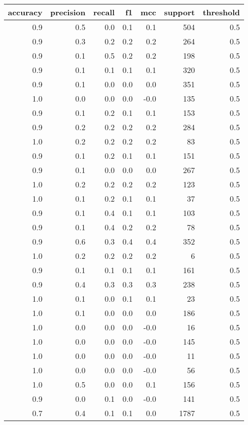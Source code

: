 \begin{tabular}{rrrrrrr}
\toprule
accuracy & precision & recall & f1 & mcc & support & threshold \\
\midrule
0.9 & 0.5 & 0.0 & 0.1 & 0.1 & 504 & 0.5 \\
0.9 & 0.3 & 0.2 & 0.2 & 0.2 & 264 & 0.5 \\
0.9 & 0.1 & 0.5 & 0.2 & 0.2 & 198 & 0.5 \\
0.9 & 0.1 & 0.1 & 0.1 & 0.1 & 320 & 0.5 \\
0.9 & 0.1 & 0.0 & 0.0 & 0.0 & 351 & 0.5 \\
1.0 & 0.0 & 0.0 & 0.0 & -0.0 & 135 & 0.5 \\
0.9 & 0.1 & 0.2 & 0.1 & 0.1 & 153 & 0.5 \\
0.9 & 0.2 & 0.2 & 0.2 & 0.2 & 284 & 0.5 \\
1.0 & 0.2 & 0.2 & 0.2 & 0.2 & 83 & 0.5 \\
0.9 & 0.1 & 0.2 & 0.1 & 0.1 & 151 & 0.5 \\
0.9 & 0.1 & 0.0 & 0.0 & 0.0 & 267 & 0.5 \\
1.0 & 0.2 & 0.2 & 0.2 & 0.2 & 123 & 0.5 \\
1.0 & 0.1 & 0.2 & 0.1 & 0.1 & 37 & 0.5 \\
0.9 & 0.1 & 0.4 & 0.1 & 0.1 & 103 & 0.5 \\
0.9 & 0.1 & 0.4 & 0.2 & 0.2 & 78 & 0.5 \\
0.9 & 0.6 & 0.3 & 0.4 & 0.4 & 352 & 0.5 \\
1.0 & 0.2 & 0.2 & 0.2 & 0.2 & 6 & 0.5 \\
0.9 & 0.1 & 0.1 & 0.1 & 0.1 & 161 & 0.5 \\
0.9 & 0.4 & 0.3 & 0.3 & 0.3 & 238 & 0.5 \\
1.0 & 0.1 & 0.0 & 0.1 & 0.1 & 23 & 0.5 \\
1.0 & 0.1 & 0.0 & 0.0 & 0.0 & 186 & 0.5 \\
1.0 & 0.0 & 0.0 & 0.0 & -0.0 & 16 & 0.5 \\
1.0 & 0.0 & 0.0 & 0.0 & -0.0 & 145 & 0.5 \\
1.0 & 0.0 & 0.0 & 0.0 & -0.0 & 11 & 0.5 \\
1.0 & 0.0 & 0.0 & 0.0 & -0.0 & 56 & 0.5 \\
1.0 & 0.5 & 0.0 & 0.0 & 0.1 & 156 & 0.5 \\
0.9 & 0.0 & 0.1 & 0.0 & -0.0 & 141 & 0.5 \\
0.7 & 0.4 & 0.1 & 0.1 & 0.0 & 1787 & 0.5 \\
\bottomrule
\end{tabular}
